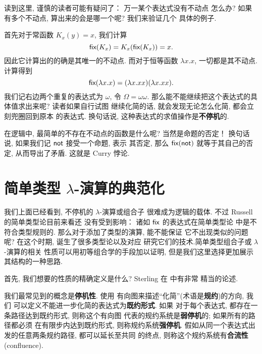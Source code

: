 读到这里, 谨慎的读者可能有疑问了： 万一某个表达式没有不动点
怎么办? 如果有多个不动点, 算出来的会是哪一个呢? 我们来验证几个
具体的例子.

首先对于常函数 \(K_x(y) = x\), 我们计算
\[\textsf{fix}(K_x) = K_x(\textsf{fix}(K_x)) = x.\]
因此它计算出的的确是其唯一的不动点. 而对于恒等函数
\(\lambda x. x\), 一切都是其不动点. 计算得到
\[\textsf{fix}(\lambda x.x) = (\lambda x.xx)(\lambda x.xx).\]
我们记右边两个重复的表达式为 \(\omega\), 令 \(\Omega = \omega\omega\).
那么能不能继续把这个表达式的具体值求出来呢? 读者如果自行试图
继续化简的话, 就会发现无论怎么化简, 都会立刻兜圈回到原本
的表达式. 换句话说, 这种表达式的求值操作是\textbf{不停机}的.

在逻辑中, 最简单的不存在不动点的函数是什么呢? 当然是命题的否定！
换句话说, 如果我们记 \(\textsf{not}\) 接受一个命题, 表示
其否定, 那么 \(\textsf{fix}(\textsf{not})\) 就等于其自己的否定,
从而导出了矛盾. 这就是 Curry 悖论.

\section{简单类型 \texorpdfstring{\(\lambda\)}{Lambda}-演算的典范化}
\label{beginning:ccc}
\begin{center}%
\end{center}

我们上面已经看到, 不停机的 \(\lambda\)-演算或组合子
很难成为逻辑的载体. 不过 Russell 的简单类型论目前来看还
没有受到影响： 诸如 \(\textsf{fix}\) 的表达式在简单类型论
中是不符合类型规则的. 那么对于添加了类型的演算, 能不能保证
它不出现类似的问题呢? 在这个时期, 诞生了很多类型论以及对应
研究它们的技术.简单类型组合子或 \(\lambda\)-演算的相关
性质可以用初等组合学的手段加以证明\cite{loader:1998:stlc},
但是我们这里选择更加展示其结构的一种思路\cite[\S4.2]{sterling:2021:thesis}.

首先, 我们想要的性质的精确定义是什么? Sterling
在 \cite[\S5.1]{sterling:2021:thesis} 中有非常
精当的论述.

我们最常见到的概念是\textbf{停机性}. 使用
有向图来描述“化简”(术语是\textbf{规约})的方向, 我们
可以定义不能进一步化简的表达式为\textbf{既约形式}. 如果
对于每个表达式, 都存在一条路径达到既约形式, 则称这个有向图
代表的规约系统是\textbf{弱停机}的; 如果所有的路径都必须
在有限步内达到既约形式, 则称规约系统\textbf{强停机}.
假如从同一个表达式出发的任意两条规约路径, 都可以延长至共同
的终点, 则称这个规约系统有\textbf{合流性}(confluence).


